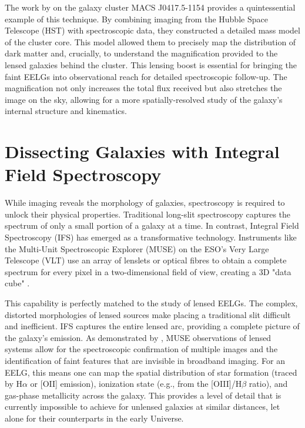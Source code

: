 \documentclass[fleqn,usenatbib]{mnras}
\begin{document}
The work by \citet{Jauzac2018} on the galaxy cluster MACS J0417.5-1154 provides a quintessential example of this technique. By combining imaging from the Hubble Space Telescope (HST) with spectroscopic data, they constructed a detailed mass model of the cluster core. This model allowed them to precisely map the distribution of dark matter and, crucially, to understand the magnification provided to the lensed galaxies behind the cluster. This lensing boost is essential for bringing the faint EELGs into observational reach for detailed spectroscopic follow-up. The magnification not only increases the total flux received but also stretches the image on the sky, allowing for a more spatially-resolved study of the galaxy's internal structure and kinematics.

\section{Dissecting Galaxies with Integral Field Spectroscopy}

While imaging reveals the morphology of galaxies, spectroscopy is required to unlock their physical properties. Traditional long-slit spectroscopy captures the spectrum of only a small portion of a galaxy at a time. In contrast, Integral Field Spectroscopy (IFS) has emerged as a transformative technology. Instruments like the Multi-Unit Spectroscopic Explorer (MUSE) on the ESO's Very Large Telescope (VLT) use an array of lenslets or optical fibres to obtain a complete spectrum for every pixel in a two-dimensional field of view, creating a 3D "data cube" \citep{Jauzac2018}.

This capability is perfectly matched to the study of lensed EELGs. The complex, distorted morphologies of lensed sources make placing a traditional slit difficult and inefficient. IFS captures the entire lensed arc, providing a complete picture of the galaxy's emission. As demonstrated by \citet{Jauzac2018}, MUSE observations of lensed systems allow for the spectroscopic confirmation of multiple images and the identification of faint features that are invisible in broadband imaging. For an EELG, this means one can map the spatial distribution of star formation (traced by H$\alpha$ or [OII] emission), ionization state (e.g., from the [OIII]/H$\beta$ ratio), and gas-phase metallicity across the galaxy. This provides a level of detail that is currently impossible to achieve for unlensed galaxies at similar distances, let alone for their counterparts in the early Universe.
\end{document}
